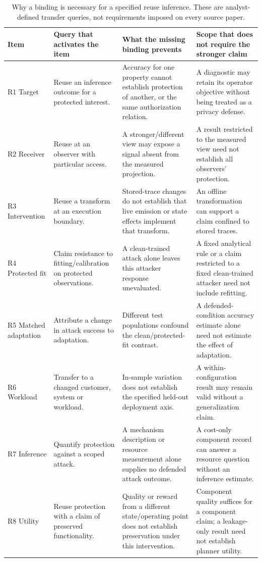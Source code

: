 \begin{table}[t]\centering\footnotesize
\caption{Why a binding is necessary for a specified reuse inference. These are analyst-defined transfer queries, not requirements imposed on every source paper.}\label{tab:r20-necessity}
\begin{tabularx}{\textwidth}{@{}p{}YYY@{}}\toprule
Item & Query that activates the item & What the missing binding prevents & Scope that does not require the stronger claim\\\midrule
R1 Target & Reuse an inference outcome for a protected interest. & Accuracy for one property cannot establish protection of another, or the same authorization relation. & A diagnostic may retain its operator objective without being treated as a privacy defense.\\
R2 Receiver & Reuse at an observer with particular access. & A stronger/different view may expose a signal absent from the measured projection. & A result restricted to the measured view need not establish all observers' protection.\\
R3 Intervention & Reuse a transform at an execution boundary. & Stored-trace changes do not establish that live emission or state effects implement that transform. & An offline transformation can support a claim confined to stored traces.\\
R4 Protected fit & Claim resistance to fitting/calibration on protected observations. & A clean-trained attack alone leaves this attacker response unevaluated. & A fixed analytical rule or a claim restricted to a fixed clean-trained attacker need not include refitting.\\
R5 Matched adaptation & Attribute a change in attack success to adaptation. & Different test populations confound the clean/protected-fit contrast. & A defended-condition accuracy estimate alone need not estimate the effect of adaptation.\\
R6 Workload & Transfer to a changed customer, system or workload. & In-sample variation does not establish the specified held-out deployment axis. & A within-configuration result may remain valid without a generalization claim.\\
R7 Inference & Quantify protection against a scoped attack. & A mechanism description or resource measurement alone supplies no defended attack outcome. & A cost-only component record can answer a resource question without an inference estimate.\\
R8 Utility & Reuse protection with a claim of preserved functionality. & Quality or reward from a different state/operating point does not establish preservation under this intervention. & Component quality suffices for a component claim; a leakage-only result need not establish planner utility.\\

\end{tabularx}
\end{table}
